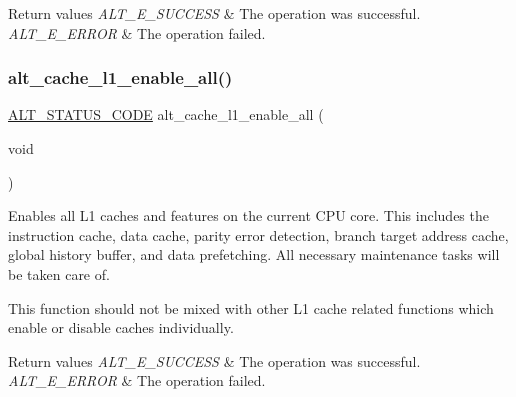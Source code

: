 \begin{DoxyRetVals}{Return values}
{\em A\+L\+T\+\_\+\+E\+\_\+\+S\+U\+C\+C\+E\+SS} & The operation was successful. \\
\hline
{\em A\+L\+T\+\_\+\+E\+\_\+\+E\+R\+R\+OR} & The operation failed. \\
\hline
\end{DoxyRetVals}
\mbox{\label{group__CACHE__L1_gaf7e077788e68609d50abf4876fab8a45}} 
\subsubsection{\texorpdfstring{alt\_cache\_l1\_enable\_all()}{alt\_cache\_l1\_enable\_all()}}
{\footnotesize\ttfamily \mbox{\hyperlink{hwlib_8h_abdb0d369f069723ca55d6c94bcaaaa12}{A\+L\+T\+\_\+\+S\+T\+A\+T\+U\+S\+\_\+\+C\+O\+DE}} alt\+\_\+cache\+\_\+l1\+\_\+enable\+\_\+all (\begin{DoxyParamCaption}\item[{void}]{ }\end{DoxyParamCaption})}

Enables all L1 caches and features on the current C\+PU core. This includes the instruction cache, data cache, parity error detection, branch target address cache, global history buffer, and data prefetching. All necessary maintenance tasks will be taken care of.

This function should not be mixed with other L1 cache related functions which enable or disable caches individually.


\begin{DoxyRetVals}{Return values}
{\em A\+L\+T\+\_\+\+E\+\_\+\+S\+U\+C\+C\+E\+SS} & The operation was successful. \\
\hline
{\em A\+L\+T\+\_\+\+E\+\_\+\+E\+R\+R\+OR} & The operation failed. \\
\hline
\end{DoxyRetVals}
\mbox{\label{group__CACHE__L1_ga6e68dac4309b352d857e6013f53c405e}} 
